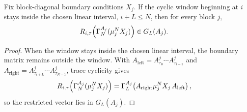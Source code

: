 \begin{lemma}
    \label{lem:block_diagonal_boundary_nonwrapping_component}
    \leanok
    Fix block-diagonal boundary conditions $X_j$. If the cyclic window beginning
    at $i$ stays inside the chosen linear interval, $i+L\le N$, then
    for every block $j$,
    \begin{align}
        R_{i,\tau}\!\left(\Gamma_N^{A_j}(\mu_j^NX_j)\right)
         & \in G_L(A_j).
        \notag
    \end{align}
\end{lemma}

\begin{proof}
    \leanok
    When the window stays inside the chosen linear interval, the boundary matrix
    remains outside the window. With
    $A_{\mathrm{left}}=A^j_{\tau_0}\cdots A^j_{\tau_{i-1}}$ and
    $A_{\mathrm{right}}=A^j_{\tau_{i+L}}\cdots A^j_{\tau_{N-1}}$, trace
    cyclicity gives
    \begin{align}
        R_{i,\tau}\!\left(\Gamma_N^{A_j}(\mu_j^NX_j)\right)
         & =
        \Gamma_L^{A_j}\!\left(A_{\mathrm{right}} \mu_j^NX_j\,A_{\mathrm{left}}\right),
        \notag
    \end{align}
    so the restricted vector lies in $G_L(A_j)$.
\end{proof}

